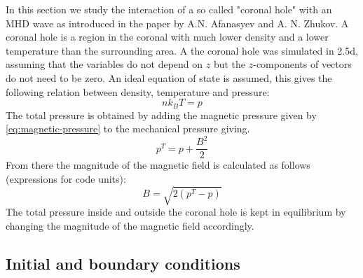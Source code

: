 In this section we study the interaction of a so called "coronal hole" with an MHD wave as introduced in the paper \cite{coronal-hole} by A.N. Afanasyev and A. N. Zhukov. 
A coronal hole is a region in the coronal with much lower density and a lower temperature than the surrounding area.
A the coronal hole was simulated in 2.5d, assuming that the variables do not depend on $z$ but the $z$-components of vectors do not need to be zero.
An ideal equation of state is assumed, this gives the following relation between density, temperature and pressure:
\begin{equation}
	nk_BT = p
	\label{eq:ideal-gas}
\end{equation}
The total pressure is obtained by adding the magnetic pressure given by \cref{eq:magnetic-pressure} to the mechanical pressure giving.
\begin{equation*}
	p^T = p + \frac{B^2}{2}
\end{equation*}
From there the magnitude of the magnetic field is calculated as follows (expressions for code units):
\begin{equation}
	B = \sqrt{2 \left( p^T-p \right) }
	\label{eq:magnetic-magnitude}
\end{equation}
The total pressure inside and outside the coronal hole is kept in equilibrium by changing the magnitude of the magnetic field accordingly.

\subsection{Initial and boundary conditions}

